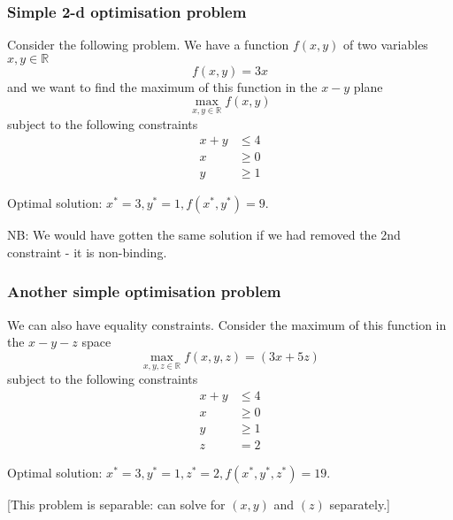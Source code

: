 \documentclass[10pt,aspectratio=169,dvipsnames]{beamer}
\begin{document}
\begin{frame}
  \frametitle{Simple 2-d optimisation problem}

  Consider the following problem. We have a function $f(x,y)$ of two variables $x,y\in \mathbb{R}$
  \begin{equation*}
    f(x,y) = 3x
  \end{equation*}
  and we want to find the maximum of this function in the $x-y$ plane
  \begin{equation*}
    \max_{x,y\in \mathbb{R}} f(x,y)
  \end{equation*}
  subject to the following constraints
  \begin{align}
    x + y & \leq 4 \\
    x & \geq 0 \\
    y & \geq 1
  \end{align}

  \alert{Optimal solution:} $x^* = 3, y^* = 1, f(x^*,y^*) = 9$.

  NB: We would have gotten the same solution if we had removed the 2nd constraint - it is \alert{non-binding}.
\end{frame}


\begin{frame}
  \frametitle{Another simple optimisation problem}

  We can also have equality constraints. Consider the maximum of this function in the $x-y-z$ space
  \begin{equation*}
    \max_{x,y,z\in \mathbb{R}} f(x,y,z) =  (3x + 5z)
  \end{equation*}
  subject to the following constraints
  \begin{align*}
    x + y & \leq 4 \\
    x & \geq 0 \\
    y & \geq 1 \\
    z & = 2
  \end{align*}

  \pause
  \alert{Optimal solution:} $x^* = 3, y^* = 1, z^* = 2, f(x^*,y^*,z^*) = 19$.

  [This problem is \alert{separable}: can solve for $(x,y)$ and $(z)$ separately.]
\end{frame}
\end{document}
